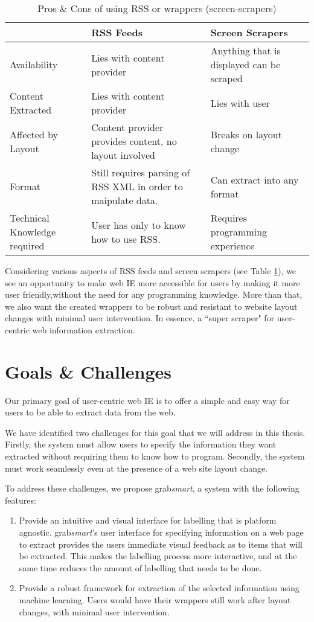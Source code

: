 \begin{table}[t]
\centering
\singlespacing
\small
\begin{tabular}{|p{3cm}|p{5cm}|p{5cm}|}
\hline
					&	RSS Feeds	&	Screen Scrapers \\
\hline
\hline
	Availability	&
	Lies with content provider &
	Anything that is displayed can be scraped \\
\hline
	Content Extracted &
	Lies with content provider &
	Lies with user \\
\hline
	Affected by Layout &
	Content provider provides content, no layout involved &
	Breaks on layout change \\
\hline
	Format &
	Still requires parsing of RSS XML in order to maipulate data. &
	Can extract into any format \\
\hline
	Technical Knowledge required &
	User has only to know how to use RSS. &
	Requires programming experience \\
	\hline
\end{tabular}
\caption{Pros \& Cons of using RSS or wrappers (screen-scrapers)}
\label{tab:procons}
\end{table}


Considering various aspects of RSS feeds and screen scrapers (see Table \ref{tab:procons}),
we see an opportunity to make web IE more accessible for 
users by making it more user friendly,without the need for any programming knowledge.
More than that, we also want the created wrappers to be robust and resistant to website layout
changes with minimal user intervention.
In essence, a ``super scraper" for user-centric web information extraction.

\section{Goals \& Challenges}
Our primary goal of user-centric web IE is to offer a simple and easy way for users
to be able to extract data from the web. 

We have identified two challenges for this goal that we will address in this thesis.
Firstly, the system must allow users to specify the information
they want extracted without requiring them to know how to program.
Secondly, the system must work seamlessly even at the presence of a web site layout
change.

To address these challenges, we propose
grab\textit{smart}, a system with the following features:
	\begin{enumerate}
		\item Provide an intuitive and visual interface for labelling that is platform agnostic.
		grab\textit{smart}'s user interface for specifying information on a web page to extract
		 provides the users
		 immediate visual feedback as to items that will be extracted. This makes the labelling process more interactive, and at the
		 same time reduces the amount of labelling that needs to be done.
		\item Provide a robust framework for extraction of the selected information using
		machine learning. Users would have their wrappers still work after layout changes, with minimal
		user intervention.
	\end{enumerate}

